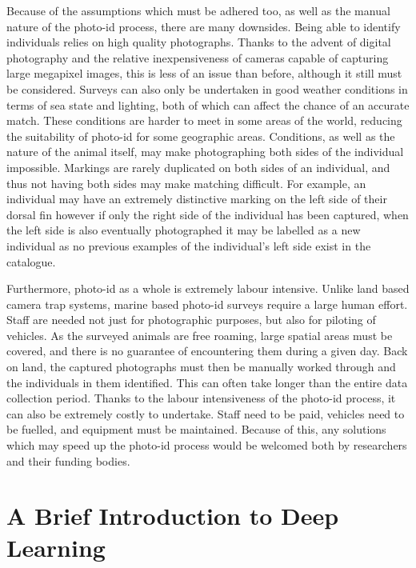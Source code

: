 Because of the assumptions which must be adhered too, as well as the manual nature of the photo-id process, there are many downsides. Being able to identify individuals relies on high quality photographs. Thanks to the advent of digital photography and the relative inexpensiveness of cameras capable of capturing large megapixel images, this is less of an issue than before, although it still must be considered. Surveys can also only be undertaken in good weather conditions in terms of sea state and lighting, both of which can affect the chance of an accurate match. These conditions are harder to meet in some areas of the world, reducing the suitability of photo-id for some geographic areas. Conditions, as well as the nature of the animal itself, may make photographing both sides of the individual impossible. Markings are rarely duplicated on both sides of an individual, and thus not having both sides may make matching difficult. For example, an individual may have an extremely distinctive marking on the left side of their dorsal fin however if only the right side of the individual has been captured, when the left side is also eventually photographed it may be labelled as a new individual as no previous examples of the individual's left side exist in the catalogue. 

Furthermore, photo-id as a whole is extremely labour intensive. Unlike land based camera trap systems, marine based photo-id surveys require a large human effort. Staff are needed not just for photographic purposes, but also for piloting of vehicles. As the surveyed animals are free roaming, large spatial areas must be covered, and there is no guarantee of encountering them during a given day. Back on land, the captured photographs must then be manually worked through and the individuals in them identified. This can often take longer than the entire data collection period. Thanks to the labour intensiveness  of the photo-id process, it can also be extremely costly to undertake. Staff need to be paid, vehicles need to be fuelled, and equipment must be maintained. Because of this, any solutions which may speed up the photo-id process would be welcomed both by researchers and their funding bodies. 

\section{A Brief Introduction to Deep Learning}\label{ch:Background,sec:DLIntro}

